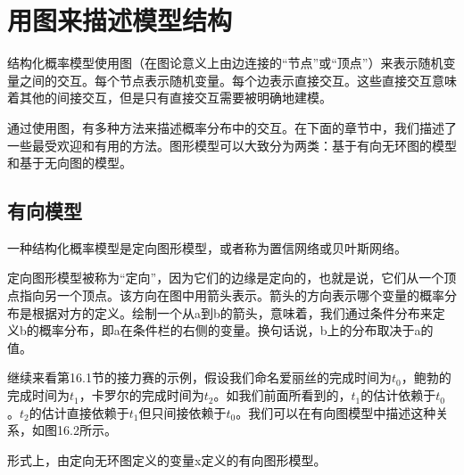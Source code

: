 \section{用图来描述模型结构}
结构化概率模型使用图（在图论意义上由边连接的“节点”或“顶点”）来表示随机变量之间的交互。每个节点表示随机变量。每个边表示直接交互。这些直接交互意味着其他的间接交互，但是只有直接交互需要被明确地建模。

通过使用图，有多种方法来描述概率分布中的交互。在下面的章节中，我们描述了一些最受欢迎和有用的方法。图形模型可以大致分为两类：基于有向无环图的模型和基于无向图的模型。

\subsection{有向模型}
一种结构化概率模型是定向图形模型，或者称为置信网络或贝叶斯网络。

定向图形模型被称为“定向”，因为它们的边缘是定向的，也就是说，它们从一个顶点指向另一个顶点。该方向在图中用箭头表示。箭头的方向表示哪个变量的概率分布是根据对方的定义。绘制一个从a到b的箭头，意味着，我们通过条件分布来定义b的概率分布，即a在条件栏的右侧的变量。换句话说，b上的分布取决于a的值。

继续来看第16.1节的接力赛的示例，假设我们命名爱丽丝的完成时间为$t_0$，鲍勃的完成时间为$t_1$，卡罗尔的完成时间为$t_2$。如我们前面所看到的，$t_1$的估计依赖于$t_0$。$t_2$的估计直接依赖于$t_1$但只间接依赖于$t_0$。我们可以在有向图模型中描述这种关系，如图16.2所示。

形式上，由定向无环图定义的变量x定义的有向图形模型。
